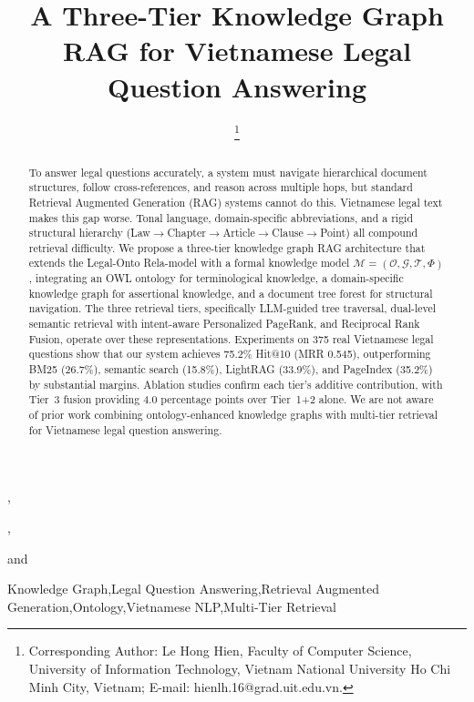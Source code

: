 \documentclass{IOS-Book-Article}
\providecommand{\runtitle}[1]{}
\begin{document}
\pagestyle{headings}
\def\thepage{}

\begin{frontmatter}

\title{A Three-Tier Knowledge Graph RAG for Vietnamese Legal Question Answering}

\author[A]{ %
\thanks{Corresponding Author: Le Hong Hien, Faculty of Computer Science, University of Information Technology, Vietnam National University Ho Chi Minh City, Vietnam; E-mail: hienlh.16@grad.uit.edu.vn.}},
\author[A]{ },
\author[B]{ }
and
\author[A]{ }

\runtitle{Three-Tier KG RAG for Vietnamese Legal QA}
\address[A]{Faculty of Computer Science, University of Information Technology, Vietnam National University Ho Chi Minh City, Vietnam}
\address[B]{School of Computer Science, University College Dublin, Ireland}

\begin{abstract}
To answer legal questions accurately, a system must navigate hierarchical document structures, follow cross-references, and reason across multiple hops, but standard Retrieval Augmented Generation (RAG) systems cannot do this. Vietnamese legal text makes this gap worse. Tonal language, domain-specific abbreviations, and a rigid structural hierarchy (Law$\to$Chapter$\to$Article$\to$Clause$\to$Point) all compound retrieval difficulty. We propose a three-tier knowledge graph RAG architecture that extends the Legal-Onto Rela-model with a formal knowledge model $\mathcal{M} = (\mathcal{O}, \mathcal{G}, \mathcal{T}, \Phi)$, integrating an OWL ontology for terminological knowledge, a domain-specific knowledge graph for assertional knowledge, and a document tree forest for structural navigation. The three retrieval tiers, specifically LLM-guided tree traversal, dual-level semantic retrieval with intent-aware Personalized PageRank, and Reciprocal Rank Fusion, operate over these representations. Experiments on 375 real Vietnamese legal questions show that our system achieves 75.2\% Hit@10 (MRR 0.545), outperforming BM25 (26.7\%), semantic search (15.8\%), LightRAG (33.9\%), and PageIndex (35.2\%) by substantial margins. Ablation studies confirm each tier's additive contribution, with Tier~3 fusion providing 4.0 percentage points over Tier~1+2 alone. We are not aware of prior work combining ontology-enhanced knowledge graphs with multi-tier retrieval for Vietnamese legal question answering.
\end{abstract}

\begin{keyword}
Knowledge Graph\sep Legal Question Answering\sep Retrieval Augmented Generation\sep Ontology\sep Vietnamese NLP\sep Multi-Tier Retrieval
\end{keyword}

\end{frontmatter}
\end{document}
